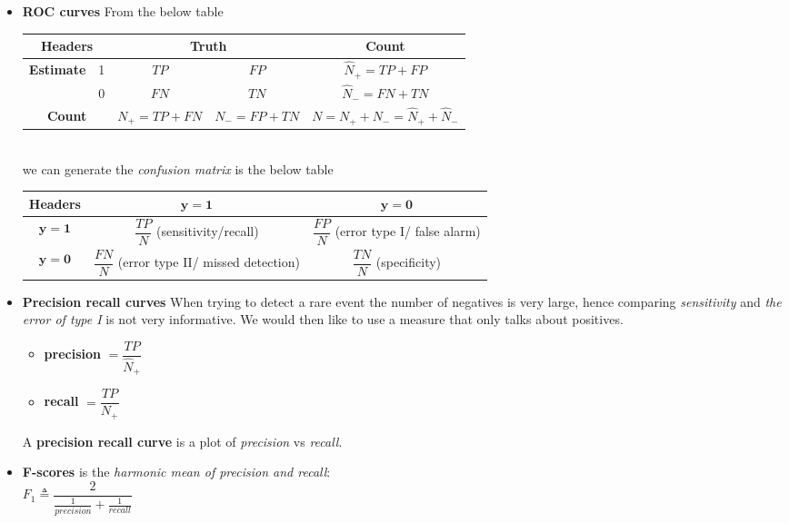 \begin{itemize}
    \item \textbf{ROC curves} From the below table \\
        \begin{tabular}{|cc|*{3}{c|}}
            \hline
            \multicolumn{2}{|c}{\textbf{Headers}} & \multicolumn{2}{|c|}{\textbf{Truth}} &
            \textbf{Count}\\
            \hline
            \multirow{2}{*}{\textbf{Estimate}} & 1 & $TP$ & $FP$ & $\hat{N}_{+}=TP + FP$\\
                                               & 0 & $FN$ & $TN$ & $\hat{N}_{-}=FN + TN$\\
            \hline
            \multicolumn{2}{|c|}{\textbf{Count}} & $N_{+}=TP+FN$ & $N_{-}=FP+TN$ 
                                               & $N=N_{+}+N_{-}=\hat{N}_{+}+\hat{N}_{-}$\\
            \hline
        \end{tabular}\\
        we can generate the \emph{confusion matrix} is the below table\\
        \begin{tabular}{|*{3}{c|}}
            \hline
            \textbf{Headers} & $\bm{y=1}$ & $\bm{y=0}$\\
            \hline
            $\bm{\hat{y}=1}$ & $\dfrac{TP}{N}$ (sensitivity/recall) 
                           & $\dfrac{FP}{N}$ (error type I/ false alarm) \\
            \hline
            $\bm{\hat{y}=0}$ & $\dfrac{FN}{N}$ (error type II/ missed detection) 
                           & $\dfrac{TN}{N}$ (specificity) \\
            \hline
        \end{tabular}
    \item \textbf{Precision recall curves}
        When trying to detect a rare event the number of negatives is very large, hence
        comparing \emph{sensitivity} and \emph{the error of type I} is not very 
        informative. We would then like to use a measure that only talks about positives.
        \begin{itemize}
            \item \textbf{precision} $=\dfrac{TP}{\hat{N}_{+}}$
            \item \textbf{recall} $=\dfrac{TP}{N_{+}}$
        \end{itemize}
        A \textbf{precision recall curve} is a plot of \textit{precision} vs 
        \textit{recall}.
    \item \textbf{F-scores} is the \emph{harmonic mean of precision and recall}:\\
        $F_{1} \triangleq \dfrac{2}{\frac{1}{precision} + \frac{1}{recall}}$
\end{itemize}

